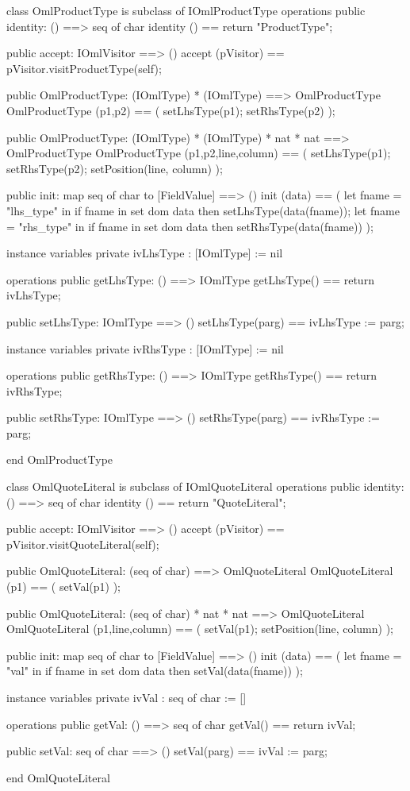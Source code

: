 \begin{vdm_al}
class OmlProductType is subclass of IOmlProductType
operations
  public identity: () ==> seq of char
  identity () == return "ProductType";

  public accept: IOmlVisitor ==> ()
  accept (pVisitor) == pVisitor.visitProductType(self);

  public OmlProductType:
    (IOmlType) *
    (IOmlType) ==> OmlProductType
  OmlProductType (p1,p2) == 
    ( setLhsType(p1);
      setRhsType(p2) );

  public OmlProductType:
    (IOmlType) *
    (IOmlType) *
    nat *
    nat ==> OmlProductType
  OmlProductType (p1,p2,line,column) == 
    ( setLhsType(p1);
      setRhsType(p2);
      setPosition(line, column) );

  public init: map seq of char to [FieldValue] ==> ()
  init (data) ==
    ( let fname = "lhs_type" in
        if fname in set dom data
        then setLhsType(data(fname));
      let fname = "rhs_type" in
        if fname in set dom data
        then setRhsType(data(fname)) );

instance variables
  private ivLhsType : [IOmlType] := nil

operations
  public getLhsType: () ==> IOmlType
  getLhsType() == return ivLhsType;

  public setLhsType: IOmlType ==> ()
  setLhsType(parg) == ivLhsType := parg;

instance variables
  private ivRhsType : [IOmlType] := nil

operations
  public getRhsType: () ==> IOmlType
  getRhsType() == return ivRhsType;

  public setRhsType: IOmlType ==> ()
  setRhsType(parg) == ivRhsType := parg;

end OmlProductType
\end{vdm_al}

\begin{vdm_al}
class OmlQuoteLiteral is subclass of IOmlQuoteLiteral
operations
  public identity: () ==> seq of char
  identity () == return "QuoteLiteral";

  public accept: IOmlVisitor ==> ()
  accept (pVisitor) == pVisitor.visitQuoteLiteral(self);

  public OmlQuoteLiteral:
    (seq of char) ==> OmlQuoteLiteral
  OmlQuoteLiteral (p1) == 
    ( setVal(p1) );

  public OmlQuoteLiteral:
    (seq of char) *
    nat *
    nat ==> OmlQuoteLiteral
  OmlQuoteLiteral (p1,line,column) == 
    ( setVal(p1);
      setPosition(line, column) );

  public init: map seq of char to [FieldValue] ==> ()
  init (data) ==
    ( let fname = "val" in
        if fname in set dom data
        then setVal(data(fname)) );

instance variables
  private ivVal : seq of char := []

operations
  public getVal: () ==> seq of char
  getVal() == return ivVal;

  public setVal: seq of char ==> ()
  setVal(parg) == ivVal := parg;

end OmlQuoteLiteral
\end{vdm_al}

